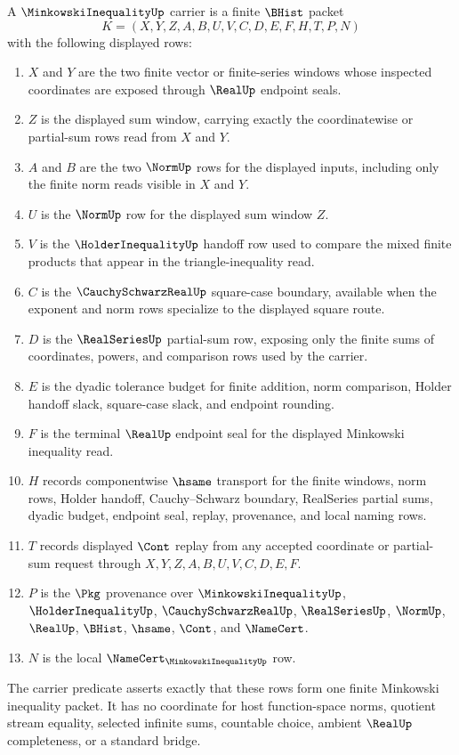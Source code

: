 \begin{definition}\label{def:minkowski-inequality-carrier}
A $\MinkowskiInequalityUp$ carrier is a finite $\BHist$ packet
$$
K=(X,Y,Z,A,B,U,V,C,D,E,F,H,T,P,N)
$$
with the following displayed rows:
\begin{enumerate}
\item $X$ and $Y$ are the two finite vector or finite-series windows whose inspected coordinates are exposed through $\RealUp$ endpoint seals.
\item $Z$ is the displayed sum window, carrying exactly the coordinatewise or partial-sum rows read from $X$ and $Y$.
\item $A$ and $B$ are the two $\NormUp$ rows for the displayed inputs, including only the finite norm reads visible in $X$ and $Y$.
\item $U$ is the $\NormUp$ row for the displayed sum window $Z$.
\item $V$ is the $\HolderInequalityUp$ handoff row used to compare the mixed finite products that appear in the triangle-inequality read.
\item $C$ is the $\CauchySchwarzRealUp$ square-case boundary, available when the exponent and norm rows specialize to the displayed square route.
\item $D$ is the $\RealSeriesUp$ partial-sum row, exposing only the finite sums of coordinates, powers, and comparison rows used by the carrier.
\item $E$ is the dyadic tolerance budget for finite addition, norm comparison, Holder handoff slack, square-case slack, and endpoint rounding.
\item $F$ is the terminal $\RealUp$ endpoint seal for the displayed Minkowski inequality read.
\item $H$ records componentwise $\hsame$ transport for the finite windows, norm rows, Holder handoff, Cauchy--Schwarz boundary, RealSeries partial sums, dyadic budget, endpoint seal, replay, provenance, and local naming rows.
\item $T$ records displayed $\Cont$ replay from any accepted coordinate or partial-sum request through $X,Y,Z,A,B,U,V,C,D,E,F$.
\item $P$ is the $\Pkg$ provenance over $\MinkowskiInequalityUp$, $\HolderInequalityUp$, $\CauchySchwarzRealUp$, $\RealSeriesUp$, $\NormUp$, $\RealUp$, $\BHist$, $\hsame$, $\Cont$, and $\NameCert$.
\item $N$ is the local $\NameCert_{\MinkowskiInequalityUp}$ row.
\end{enumerate}
The carrier predicate asserts exactly that these rows form one finite Minkowski inequality packet. It has no coordinate for host function-space norms, quotient stream equality, selected infinite sums, countable choice, ambient $\RealUp$ completeness, or a standard bridge.
\end{definition}

